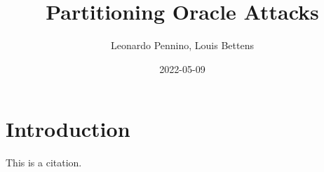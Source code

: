 \documentclass[9pt, sans, a4paper]{article}
\date{2022-05-09}
\title{Partitioning Oracle Attacks}
\author{Leonardo Pennino, Louis Bettens}
\begin{document}
\maketitle

\section{Introduction}

This is a citation.\cite{partitioning}


\footnotesize 
\end{document}
